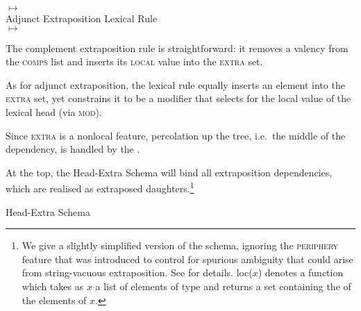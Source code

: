 \documentclass[output=paper
,notxmath 
 	        ,biblatex
                ,babelshorthands
                ,newtxmath
                ,draftmode
                ,colorlinks, citecolor=brown
]{langscibook}
\begin{document}
$\mapsto$ \\
\flushright {}
\z
\eas
Adjunct Extraposition Lexical Rule\\
$\mapsto$ \\
\flushright{}
\zs


The complement extraposition rule is straightforward: it removes a
valency from the \textsc{comps} list and inserts its \textsc{local}
value into the \textsc{extra} set. 

As for adjunct extraposition, the lexical rule  equally inserts an
element into the \textsc{extra} set, yet constrains it to be a
modifier that selects for the local value of the lexical head (via
\textsc{mod}). 

Since \textsc{extra} is a nonlocal feature, percolation up the tree,
i.e.\ the middle of the dependency, is handled by the 
\citep[]{Pollard:Sag:94}.

At the top, the Head-Extra Schema will bind all extraposition
dependencies, which are realised as extraposed daughters.\footnote{We
  give a slightly simplified version of the schema, ignoring the
  \textsc{periphery} feature that was introduced to control for spurious
  ambiguity that could arise from string-vacuous extraposition. See
  \citet[--305]{Keller:95} for details. \textsf{loc($x$)} denotes a function
  which takes as $x$ a list of elements of type  and
  returns a set containing the \locvs of the elements of $x$.}
\begin{exe}
  \ex Head-Extra Schema


\end{exe}
\end{document}
